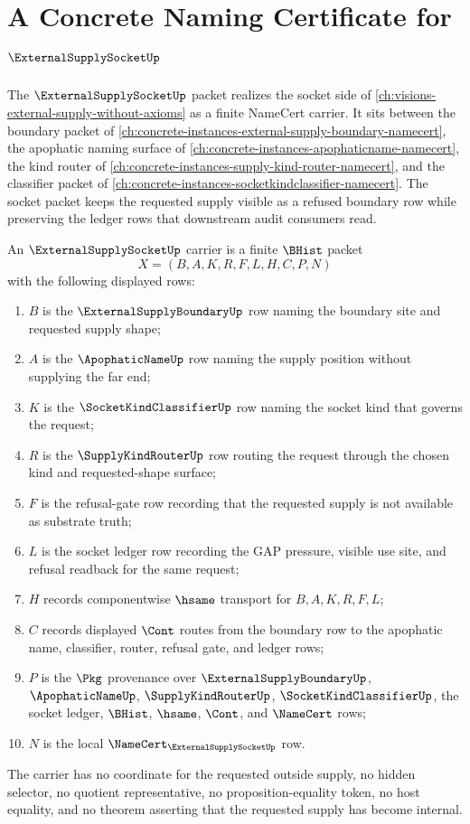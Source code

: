 \chapter{A Concrete Naming Certificate for $\ExternalSupplySocketUp$}
\label{ch:concrete-instances-external-supply-socket-namecert}

The $\ExternalSupplySocketUp$ packet realizes the socket side of \autoref{ch:visions-external-supply-without-axioms} as a finite NameCert carrier. It sits between the boundary packet of \autoref{ch:concrete-instances-external-supply-boundary-namecert}, the apophatic naming surface of \autoref{ch:concrete-instances-apophaticname-namecert}, the kind router of \autoref{ch:concrete-instances-supply-kind-router-namecert}, and the classifier packet of \autoref{ch:concrete-instances-socketkindclassifier-namecert}. The socket packet keeps the requested supply visible as a refused boundary row while preserving the ledger rows that downstream audit consumers read.

\begin{definition}
\label{def:external-supply-socket-carrier}
An $\ExternalSupplySocketUp$ carrier is a finite $\BHist$ packet
$$
X=(B,A,K,R,F,L,H,C,P,N)
$$
with the following displayed rows:
\begin{enumerate}
\item $B$ is the $\ExternalSupplyBoundaryUp$ row naming the boundary site and requested supply shape;
\item $A$ is the $\ApophaticNameUp$ row naming the supply position without supplying the far end;
\item $K$ is the $\SocketKindClassifierUp$ row naming the socket kind that governs the request;
\item $R$ is the $\SupplyKindRouterUp$ row routing the request through the chosen kind and requested-shape surface;
\item $F$ is the refusal-gate row recording that the requested supply is not available as substrate truth;
\item $L$ is the socket ledger row recording the GAP pressure, visible use site, and refusal readback for the same request;
\item $H$ records componentwise $\hsame$ transport for $B,A,K,R,F,L$;
\item $C$ records displayed $\Cont$ routes from the boundary row to the apophatic name, classifier, router, refusal gate, and ledger rows;
\item $P$ is the $\Pkg$ provenance over $\ExternalSupplyBoundaryUp$, $\ApophaticNameUp$, $\SupplyKindRouterUp$, $\SocketKindClassifierUp$, the socket ledger, $\BHist$, $\hsame$, $\Cont$, and $\NameCert$ rows;
\item $N$ is the local $\NameCert_{\ExternalSupplySocketUp}$ row.
\end{enumerate}
The carrier has no coordinate for the requested outside supply, no hidden selector, no quotient representative, no proposition-equality token, no host equality, and no theorem asserting that the requested supply has become internal.
\end{definition}

